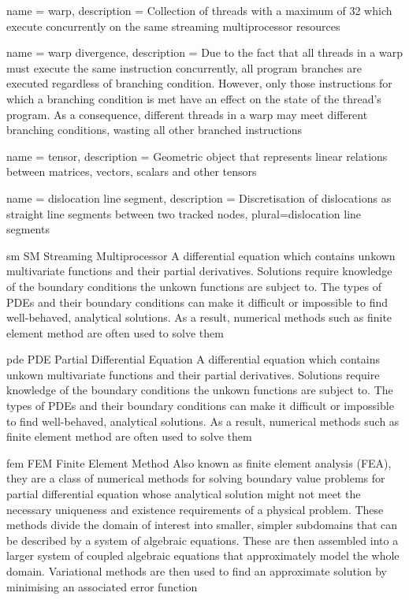 {
	name = {warp},
	description = {Collection of threads with a maximum of 32 which execute concurrently on the same streaming multiprocessor resources}
}

{
	name = {warp divergence},
	description = {Due to the fact that all threads in a warp must execute the same instruction concurrently, all program branches are executed regardless of branching condition. However, only those instructions for which a branching condition is met have an effect on the state of the thread's program. As a consequence, different threads in a warp may meet different branching conditions, wasting all other branched instructions}
}

{
	name = {tensor},
	description = {Geometric object that represents linear relations between matrices, vectors, scalars and other tensors}
}

{
	name = {dislocation line segment},
	description = {Discretisation of dislocations as straight line segments between two tracked nodes},
	plural={dislocation line segments}
}

\newdualentry
{sm}
{SM}
{Streaming Multiprocessor}
{A differential equation which contains unkown multivariate functions and their partial derivatives. Solutions require knowledge of the boundary conditions the unkown functions are subject to. The types of PDEs and their boundary conditions can make it difficult or impossible to find well-behaved, analytical solutions. As a result, numerical methods such as finite element method are often used to solve them}

\newdualentry
{pde}
{PDE}
{Partial Differential Equation}
{A differential equation which contains unkown multivariate functions and their partial derivatives. Solutions require knowledge of the boundary conditions the unkown functions are subject to. The types of PDEs and their boundary conditions can make it difficult or impossible to find well-behaved, analytical solutions. As a result, numerical methods such as finite element method are often used to solve them}

\newdualentry
{fem}
{FEM}
{Finite Element Method}
{Also known as finite element analysis (FEA), they are a class of numerical methods for solving boundary value problems for partial differential equation whose analytical solution might not meet the necessary uniqueness and existence requirements of a physical problem. These methods divide the domain of interest into smaller, simpler subdomains that can be described by a system of algebraic equations. These are then assembled into a larger system of coupled algebraic equations that approximately model the whole domain. Variational methods are then used to find an approximate solution by minimising an associated error function}

